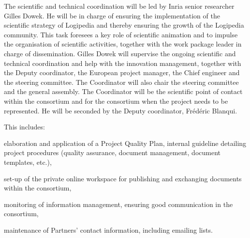 \begin{workpackage}[id=management,type=MGT,wphases=1-48,
  short=Management,
  title=Management,
  lead=Inr,InrRM=34,InnRM=2,SacRM=2,TumRM=2,LieRM=2,BelRM=2,DelRM=2,FauRM=2]
\begin{tasklist}
  \begin{task}[id=coordination,title=Scientific and technical coordination,shorttitle=Sci.\&tech.,lead=Inr,InrRM=10,wphases=1-48]
    The scientific and technical coordination will be led by Inria
    senior researcher Gilles Dowek. He will be in charge of ensuring
    the implementation of the scientific strategy of Logipedia and
    thereby ensuring the growth of the Logipedia community. This task
    foresees a key role of scientific animation and to impulse the
    organisation of scientific activities, together with the work package
    leader
    in charge of dissemination. Gilles Dowek will supervise the
    ongoing scientific and technical coordination and help with the
    innovation management, together with the Deputy coordinator,
    the European project manager, 
    the
    Chief engineer and the steering committee. The
    Coordinator will also chair the steering committee and the general
    assembly. The Coordinator will be the scientific point of contact
    within the consortium and for the consortium when the project
    needs to be represented.
    He will be seconded by the Deputy coordinator, Frédéric
    Blanqui.
  \end{task}


  \begin{task}[id=quality,title=Quality management,shorttitle=Sci.\&tech.,lead=Inr,InrRM=10,wphases=1-48]
    This includes:
\begin{compactitem}
\item
  elaboration and application of a Project Quality Plan, internal
  guideline detailing project procedures (quality assurance, document
  management, document templates, etc.),
\item
  set-up of the private online workspace for publishing and exchanging
  documents within the consortium, 
\item
  monitoring of information management, ensuring good communication
  in the consortium,
\item
  maintenance of Partners’ contact information, including emailing lists.
\end{compactitem}
\end{task}


\end{tasklist}
\end{workpackage}
